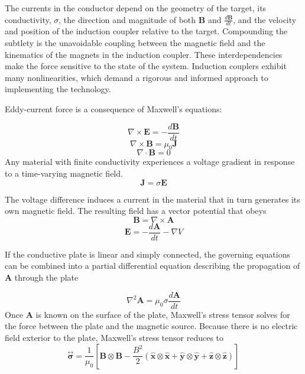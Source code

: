 The currents in the conductor depend on the geometry of the target, its conductivity, $\sigma$, the direction and magnitude of both \textbf{B} and $\frac{d\textbf{B}}{dt}$, and the velocity and position of the induction coupler relative to the target. Compounding the subtlety is the unavoidable coupling between the magnetic field and the kinematics of the magnets in the induction coupler. These interdependencies make the force sensitive to the state of the system. Induction couplers exhibit many nonlinearities, which demand a rigorous and informed approach to implementing the technology.

Eddy-current force is a consequence of Maxwell's equations:

\begin{equation}\label{eq:FaradayInduction}
\nabla \times \textbf{E} = -\frac{d\textbf{B}}{dt}
\end{equation}
\begin{equation}\label{eq:AmperesLaw}
\nabla \times \textbf{B} = \mu_0 \textbf{J}
\end{equation}
\begin{equation}\label{eq:GaussLaw}
\nabla \cdot \textbf{B} = 0
\end{equation}
Any material with finite conductivity experiences a voltage gradient in response to a time-varying magnetic field. 
\begin{equation}\label{eq:currentflow}
\textbf{J}=\sigma \textbf{E}
\end{equation}

The voltage difference induces a current in the material that in turn generates its own magnetic field. The resulting field has a vector potential that obeys 
\begin{equation}\label{eq:vectorPotential}
\textbf{B} = \nabla \times \textbf{A}
\end{equation}
\begin{equation} \label{eq:Efield}
\textbf{E} =  -\frac{d\textbf{A}}{dt} - \nabla V
\end{equation}

If the conductive plate is linear and simply connected, the governing equations can be combined into a partial differential equation describing the propagation of $\textbf{A}$ through the plate \cite{Smyth1989}

\begin{equation}\label{eq:governingPDE}
\nabla^2 \textbf{A} = \mu_0\sigma \frac{d\textbf{A}}{dt}
\end{equation}
Once \textbf{A} is known on the surface of the plate, Maxwell's stress tensor solves for the force between the plate and the magnetic source. Because there is no electric field exterior to the plate, Maxwell's stress tensor reduces to
\begin{equation} \label{eq:stressTensor}
\overset{\leftrightarrow  }{ \mathbf{\sigma} } = \frac{1}{\mu_0} \left[ \mathbf{B}\otimes\mathbf{B} - \frac{B^2 }{2} (\mathbf{\hat x}\otimes\mathbf{\hat x} + \mathbf{\hat y}\otimes\mathbf{\hat y} + \mathbf{\hat z}\otimes\mathbf{\hat z}) \right]
\end{equation}

